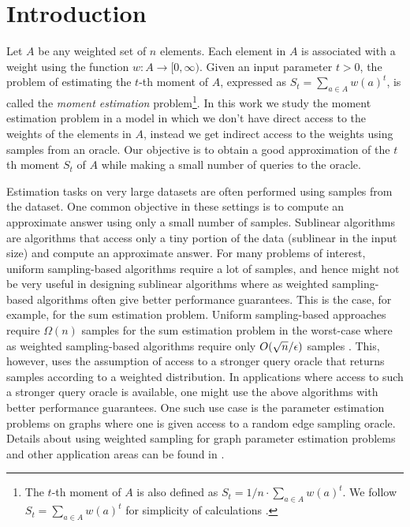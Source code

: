 \section{Introduction}


Let $A$ be any weighted set of $n$ elements. Each element in $A$ is associated with a weight using the function $w:A\rightarrow [0,\infty)$. Given an input parameter $t>0$, the problem of estimating the $t$-th moment of $A$, expressed as $S_t=\sum_{a\in A} w(a)^t$, is called the {\it moment estimation} problem\footnote{The $t$-th moment of $A$ is also defined as $S_t=1/n \cdot \sum_{a\in A} w(a)^t$. We follow $S_t=\sum_{a\in A} w(a)^t$ for simplicity of calculations \cite{ERS2019}.}. In this work we study the moment estimation problem in a model in which we don't have direct access to the weights of the elements in $A$, instead we get indirect access to the weights using samples from an oracle. Our objective is to obtain a good approximation of the $t$th moment $S_t$ of $A$ while making a small number of queries to the oracle. 


Estimation tasks on very large datasets are often performed using samples from the dataset. One common objective in these settings is to compute an approximate answer using only a small number of samples. Sublinear algorithms are algorithms that access only a tiny portion of the data (sublinear in the input size) and compute an approximate answer. For many problems of interest, uniform sampling-based algorithms require a lot of samples, and hence might not be very useful in designing sublinear algorithms where as weighted sampling-based algorithms often give better performance guarantees. This is the case, for example, for the sum estimation problem. Uniform sampling-based approaches require $\Omega(n)$ samples for the sum estimation problem in the worst-case where as weighted sampling-based algorithms require only $O(\sqrt{n}/\epsilon)$ samples \cite{MPX2007,BT2022}. This, however, uses the assumption of access to a stronger query oracle that returns samples according to a weighted distribution. In applications where access to such a stronger query oracle is available, one might use the above algorithms with better performance guarantees. One such use case is the parameter estimation problems on graphs where one is given access to a random edge sampling oracle. Details about using weighted sampling for graph parameter estimation problems and other application areas can be found in \cite{MPX2007,ABGPRY2018,BT2022}.


